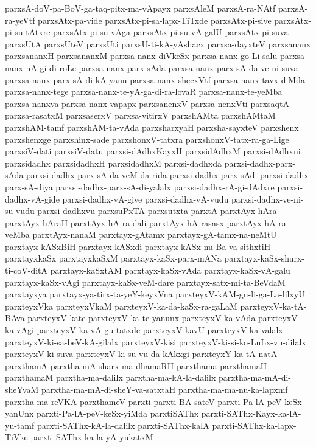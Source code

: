 {parxsA-doV-pa-BoV-ga-taq-pitx-ma-vApayx
parxsAleM
parxsA-ra-NAtf
parxsA-ra-yeVtf
parxsAtx-pa-vide
parxsAtx-pi-sa-lapx-TiTxde
parxsAtx-pi-sive
parxsAtx-pi-su-tAtxre
parxsAtx-pi-su-vAga
parxsAtx-pi-su-vA-galU
parxsAtx-pi-suva
parxsUtA
parxsUteV
parxsUti
parxsU-ti-kA-yAshacx
parxsa-dayxteV
parxsananx
parxsananxH
parxsananxM
parxsa-nanx-diVkeSx
parxsa-nanx-go-Li-salu
parxsa-nanx-nA-gi-di-roLe
parxsa-nanx-parx-sAda
parxsa-nanx-parx-sA-da-ve-ni-suva
parxsa-nanx-parx-sA-di-kA-yanu
parxsa-nanx-shecxVtf
parxsa-nanx-tavx-diMda
parxsa-nanx-tege
parxsa-nanx-te-yA-ga-di-ra-lovaR
parxsa-nanx-te-yeMba
parxsa-nanxva
parxsa-nanx-vapapx
parxsanenxV
parxsa-nenxVti
parxsaqtA
parxsa-rasatxM
parxsaserxV
parxsa-vitirxV
parxshAMta
parxshAMtaM
parxshAM-tamf
parxshAM-ta-vAda
parxsharxyaH
parxsha-sayxteV
parxshenx
parxshenxge
parxshinx-sade
parxshonxV-tatxra
parxshonxV-tatx-ra-ga-Lige
parxsiV-dati
parxsiV-datu
parxsi-dAdhxKayxH
parxsidAdhxM
parxsi-dAdhxni
parxsidadhx
parxsidadhxH
parxsidadhxM
parxsi-dadhxda
parxsi-dadhx-parx-sAda
parxsi-dadhx-parx-sA-da-veM-da-rida
parxsi-dadhx-parx-sAdi
parxsi-dadhx-parx-sA-diya
parxsi-dadhx-parx-sA-di-yalalx
parxsi-dadhx-rA-gi-dAdxre
parxsi-dadhx-vA-gide
parxsi-dadhx-vA-give
parxsi-dadhx-vA-vudu
parxsi-dadhx-ve-ni-su-vudu
parxsi-dadhxvu
parxsuPxTA
parxsutxta
parxtA
parxtAyx-hAra
parxtAyx-hAraH
parxtAyx-hA-ra-dali
parxtAyx-hA-rasasx
parxtAyx-hA-ra-veMba
parxtAyx-nanaM
parxtayx-gAtamx
parxtayx-gA-tamx-na-neMtU
parxtayx-kASxBiH
parxtayx-kASxdi
parxtayx-kASx-nu-Ba-va-sithxtiH
parxtayxkaSx
parxtayxkaSxM
parxtayx-kaSx-parx-mANa
parxtayx-kaSx-shurx-ti-coV-ditA
parxtayx-kaSxtAM
parxtayx-kaSx-vAda
parxtayx-kaSx-vA-galu
parxtayx-kaSx-vAgi
parxtayx-kaSx-veM-dare
parxtayx-satx-mi-ta-BeVdaM
parxtayxya
parxtayx-ya-tirx-ta-yeY-keyxVna
parxteyxV-kAM-gu-li-ga-La-lilxyU
parxteyxVka
parxteyxVkaM
parxteyxV-ka-da-kaSx-ra-gaLaM
parxteyxV-ka-tA-BAva
parxteyxV-kate
parxteyxV-ka-te-yanunx
parxteyxV-ka-vAda
parxteyxV-ka-vAgi
parxteyxV-ka-vA-gu-tatxde
parxteyxV-kavU
parxteyxV-ka-valalx
parxteyxV-ki-sa-beV-kA-gilalx
parxteyxV-kisi
parxteyxV-ki-si-ko-LuLx-vu-dilalx
parxteyxV-ki-suva
parxteyxV-ki-su-vu-da-kAkxgi
parxteyxY-ka-tA-natA
parxthamA
parxtha-mA-sharx-ma-dhamaRH
parxthama
parxthamaH
parxthamaM
parxtha-ma-dalilx
parxtha-ma-kA-la-dalilx
parxtha-ma-mA-di-sheYvaM
parxtha-ma-mA-di-sheY-va-satxtaH
parxtha-ma-ma-nu-ka-lapxmf
parxtha-ma-reVKA
parxthameV
parxti
parxti-BA-sateV
parxti-Pa-lA-peV-keSx-yanUnx
parxti-Pa-lA-peV-keSx-yiMda
parxtiSAThx
parxti-SAThx-Kayx-ka-lA-yu-tamf
parxti-SAThx-kA-la-dalilx
parxti-SAThx-kalA
parxti-SAThx-ka-lapx-TiVke
parxti-SAThx-ka-la-yA-yukatxM
}

